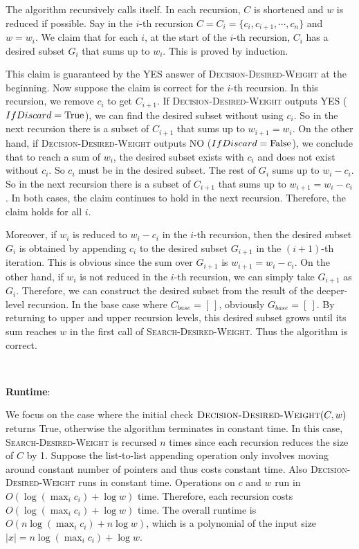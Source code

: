 \documentclass{article}
\begin{document}
The algorithm recursively calls itself. In each recursion, $C$ is shortened and $w$ is reduced if possible. Say in the $i$-th recursion $C=C_i=\{c_i,c_{i+1},\cdots,c_n\}$ and $w=w_i$. We claim that for each $i$, at the start of the $i$-th recursion, $C_i$ has a desired subset $G_i$ that sums up to $w_i$. This is proved by induction.

This claim is guaranteed by the YES answer of \textsc{Decision-Desired-Weight} at the beginning. Now suppose the claim is correct for the $i$-th recursion. In this recursion, we remove $c_i$ to get $C_{i+1}$. If \textsc{Decision-Desired-Weight} outputs YES ($IfDiscard=\textup{True}$), we can find the desired subset without using $c_i$. So in the next recursion there is a subset of $C_{i+1}$ that sums up to $w_{i+1}=w_i$. On the other hand, if \textsc{Decision-Desired-Weight} outputs NO ($IfDiscard=\textup{False}$), we conclude that to reach a sum of $w_i$, the desired subset exists with $c_i$ and does not exist without $c_i$. So $c_i$ must be in the desired subset. The rest of $G_i$ sums up to $w_i-c_i$. So in the next recursion there is a subset of $C_{i+1}$ that sums up to $w_{i+1}=w_i-c_i$. In both cases, the claim continues to hold in the next recursion. Therefore, the claim holds for all $i$.

Moreover, if $w_i$ is reduced to $w_i-c_i$ in the $i$-th recursion, then the desired subset $G_i$ is obtained by appending $c_i$ to the desired subset $G_{i+1}$ in the $(i+1)$-th iteration. This is obvious since the sum over $G_{i+1}$ is $w_{i+1}=w_i-c_i$. On the other hand, if $w_i$ is not reduced in the $i$-th recursion, we can simply take $G_{i+1}$ as $G_i$. Therefore, we can construct the desired subset from the result of the deeper-level recursion. In the base case where $C_{base}=[~]$, obviously $G_{base}=[~]$. By returning to upper and upper recursion levels, this desired subset grows until its sum reaches $w$ in the first call of \textsc{Search-Desired-Weight}. Thus the algorithm is correct.

~

\noindent\textbf{Runtime}:

We focus on the case where the initial check $\textsc{Decision-Desired-Weight}(C,w)$ returns True, otherwise the algorithm terminates in constant time. In this case, \textsc{Search-Desired-Weight} is recursed $n$ times since each recursion reduces the size of $C$ by 1. Suppose the list-to-list appending operation only involves moving around constant number of pointers and thus costs constant time. Also \textsc{Decision-Desired-Weight} runs in constant time. Operations on $c$ and $w$ run in $O(\log(\max_ic_i)+\log w)$ time. Therefore, each recursion costs $O(\log(\max_ic_i)+\log w)$ time. The overall runtime is $O(n\log(\max_ic_i)+n\log w)$, which is a polynomial of the input size $|x|=n\log(\max_ic_i)+\log w$.
\end{document}
